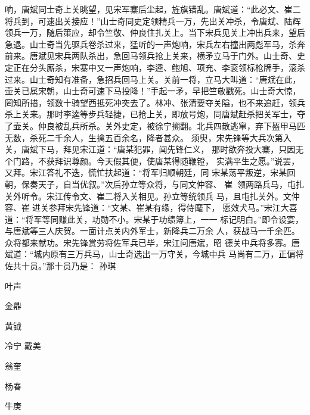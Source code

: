 响，唐斌同士奇上关眺望，见宋军寨后尘起，旌旗错乱。唐斌道：“此必文、崔二
将兵到，可速出关接应！”山士奇同史定领精兵一万，先出关冲杀，令唐斌、陆辉
领兵一万，随后策应，却令竺敬、仲良住扎关上。当下宋兵见关上冲出兵来，望后
急退。山士奇当先驱兵卷杀过来，猛听的一声炮响，宋兵左右撞出两彪军马，杀奔
前来。唐斌见宋兵两队杀出，急回马领兵抢上关来，横矛立马于门外。山士奇、史
定正在分头厮杀，宋寨中又一声炮响，李逵、鲍旭、项充、李衮领标枪牌手，滚杀
过来。山士奇知有准备，急招兵回马上关。关前一将，立马大叫道：“唐斌在此，
壶关已属宋朝，山士奇可速下马投降！”手起一矛，早把竺敬戳死。山士奇大惊，
罔知所措，领数十骑望西抵死冲突去了。林冲、张清要夺关隘，也不来追赶，领兵
杀上关来。那时李逵等步兵轻捷，已抢上关，即放号炮，同唐斌赶杀把关军士，夺
了壶关。仲良被乱兵所杀。关外史定，被徐宁搠翻。北兵四散逃窜，弃下盔甲马匹
无数，杀死二千余人，生擒五百余名，降者甚众。
须臾，宋先锋等大兵次第入关，唐斌下马，拜见宋江道：“唐某犯罪，闻先锋仁义，
那时欲奔投大寨，只因无个门路，不获拜识尊颜。今天假其便，使唐某得随鞭镫，
实满平生之愿。”说罢，又拜。宋江答礼不迭，慌忙扶起道：“将军归顺朝廷，同
宋某荡平叛逆，宋某回朝，保奏天子，自当优叙。”次后孙立等众将，与同文仲容、
崔，领两路兵马，屯扎关外听令。宋江传令文、崔二将入关相见。孙立等统领兵
马，且屯扎关外。文仲容、崔进关参拜宋先锋道：“文某、崔某有缘，得侍麾下，
愿效犬马。”宋江大喜道：“将军等同赚此关，功勋不小。宋某于功绩簿上，一一
标记明白。”即令设宴，与唐斌等三人庆贺。一面计点关内外军士，新降兵二万余
人，获战马一千余匹。众将都来献功。宋先锋赏劳将佐军兵已毕，宋江问唐斌，昭
德关中兵将多寡。唐斌道：“城内原有三万兵马，山士奇选出一万守关，今城中兵
马尚有二万，正偏将佐共十员。”那十员乃是：
孙琪

叶声

金鼎

黄钺

冷宁
戴美

翁奎

杨春

牛庚


